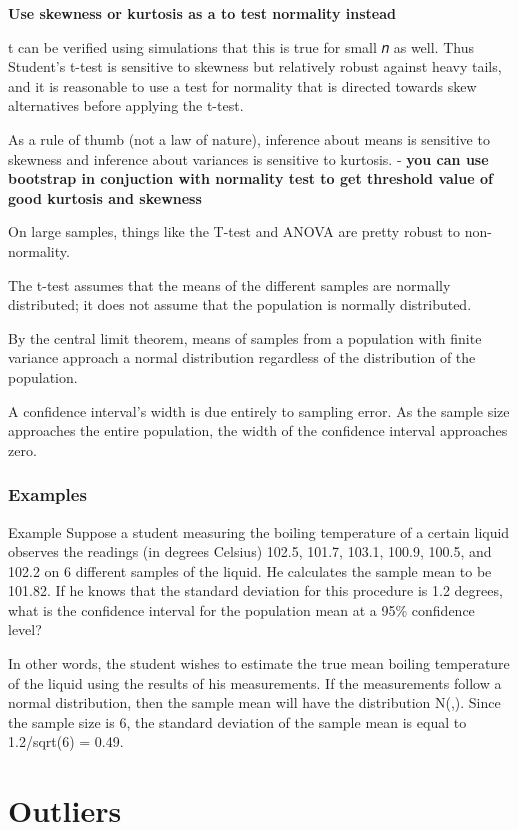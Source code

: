 \documentclass[11pt]{article}
\begin{document}
\textbf{Use skewness or kurtosis as a to test normality instead}

t can be verified using simulations that this is true for small 𝑛 as
well. Thus Student's t-test is sensitive to skewness but relatively
robust against heavy tails, and it is reasonable to use a test for
normality that is directed towards skew alternatives before applying the
t-test.

As a rule of thumb (not a law of nature), inference about means is
sensitive to skewness and inference about variances is sensitive to
kurtosis. - \textbf{you can use bootstrap in conjuction with normality
test to get threshold value of good kurtosis and skewness}

On large samples, things like the T-test and ANOVA are pretty robust to
non-normality.

The t-test assumes that the means of the different samples are normally
distributed; it does not assume that the population is normally
distributed.

By the central limit theorem, means of samples from a population with
finite variance approach a normal distribution regardless of the
distribution of the population.

A confidence interval's width is due entirely to sampling error. As the
sample size approaches the entire population, the width of the
confidence interval approaches zero.

    \subsubsection{Examples}\label{examples}

Example Suppose a student measuring the boiling temperature of a certain
liquid observes the readings (in degrees Celsius) 102.5, 101.7, 103.1,
100.9, 100.5, and 102.2 on 6 different samples of the liquid. He
calculates the sample mean to be 101.82. If he knows that the standard
deviation for this procedure is 1.2 degrees, what is the confidence
interval for the population mean at a 95\% confidence level?

In other words, the student wishes to estimate the true mean boiling
temperature of the liquid using the results of his measurements. If the
measurements follow a normal distribution, then the sample mean will
have the distribution N(,). Since the sample size is 6, the standard
deviation of the sample mean is equal to 1.2/sqrt(6) = 0.49.

    \section{Outliers}\label{outliers}
\end{document}
